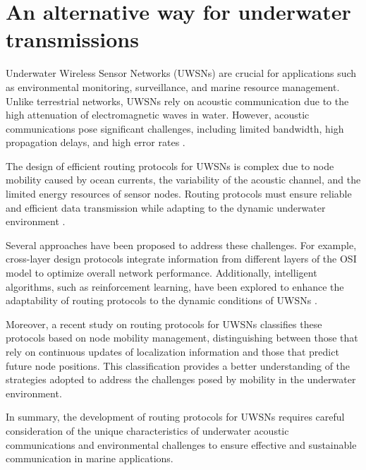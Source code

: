 \section{An alternative way for underwater transmissions}
\label{sec:underwater-comm}
Underwater Wireless Sensor Networks (UWSNs) are crucial for applications such as environmental monitoring, surveillance, and marine resource management. Unlike terrestrial networks, UWSNs rely on acoustic communication due to the high attenuation of electromagnetic waves in water. However, acoustic communications pose significant challenges, including limited bandwidth, high propagation delays, and high error rates \cite{matteo1}.

The design of efficient routing protocols for UWSNs is complex due to node mobility caused by ocean currents, the variability of the acoustic channel, and the limited energy resources of sensor nodes. Routing protocols must ensure reliable and efficient data transmission while adapting to the dynamic underwater environment \cite{matteo2}.

Several approaches have been proposed to address these challenges. For example, cross-layer design protocols integrate information from different layers of the OSI model to optimize overall network performance. Additionally, intelligent algorithms, such as reinforcement learning, have been explored to enhance the adaptability of routing protocols to the dynamic conditions of UWSNs \cite{matteo3}.

Moreover, a recent study on routing protocols for UWSNs classifies these protocols based on node mobility management, distinguishing between those that rely on continuous updates of localization information and those that predict future node positions. This classification provides a better understanding of the strategies adopted to address the challenges posed by mobility in the underwater environment. \cite{matteo4}

In summary, the development of routing protocols for UWSNs requires careful consideration of the unique characteristics of underwater acoustic communications and environmental challenges to ensure effective and sustainable communication in marine applications.


